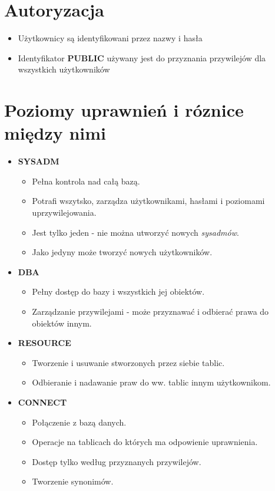 \documentclass[a4paper,twoside]{article}
\begin{document}
  	\section*{Autoryzacja}
  	\begin{itemize}
  		\item Użytkownicy są identyfikowani przez nazwy i hasła 
  		\item Identyfikator \textbf{PUBLIC} używany jest do przyznania przywilejów dla wszystkich użytkowników
  	\end{itemize}
  	
  	\section*{Poziomy uprawnień i róznice między nimi}
  	\begin{itemize}
  		\item \textbf{SYSADM}
  		\begin{itemize}
  			\item Pełna kontrola nad całą bazą.
  			\item Potrafi wszytsko, zarządza użytkownikami, hasłami i poziomami uprzywilejowania.
  			\item Jest tylko jeden - nie można utworzyć nowych \emph{sysadmów}.
  			\item Jako jedyny może tworzyć nowych użytkowników.
  		\end{itemize}
  		\item \textbf{DBA}
  		\begin{itemize}
  			\item Pełny dostęp do bazy i wszystkich jej obiektów.
  			\item Zarządzanie przywilejami - może przyznawać i odbierać prawa do obiektów innym.
  		\end{itemize}
  		\item \textbf{RESOURCE}
  		\begin{itemize}
  			\item Tworzenie i usuwanie stworzonych przez siebie tablic.
  			\item Odbieranie i nadawanie praw do ww. tablic innym użytkownikom.
  		\end{itemize}
  		\item \textbf{CONNECT}
  		\begin{itemize}
  			\item Połączenie z bazą danych.
  			\item Operacje na tablicach do których ma odpowienie uprawnienia.
  			\item Dostęp tylko według przyznanych przywilejów.
  			\item Tworzenie synonimów.
  		\end{itemize}
  	\end{itemize}
  	
\end{document}
